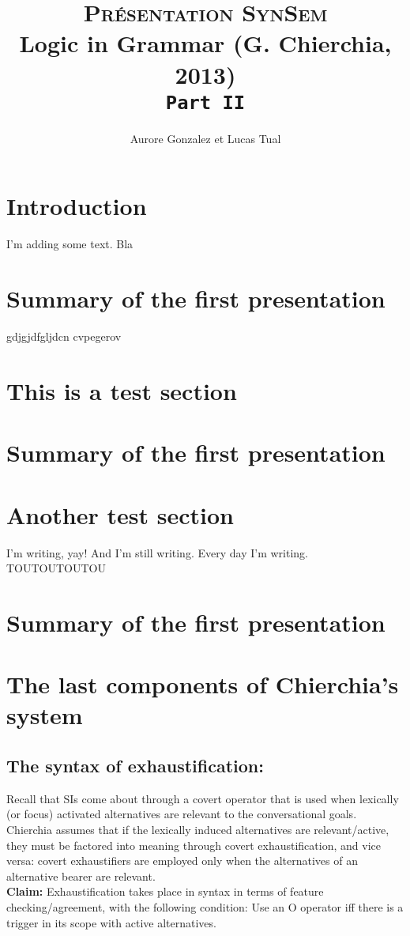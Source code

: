 \documentclass[a4paper,11pt]{article}
\title{\textsc{Présentation SynSem}\\Logic in Grammar (G. Chierchia, 2013)\\\vspace{0.3cm}\texttt{Part II}}
\author{Aurore Gonzalez et Lucas Tual}
\affil{LLING - University of Nantes}
\begin{document}
\maketitle
\tableofcontents


\section*{Introduction}
I'm adding some text. Bla

\section{Summary of the first presentation}

gdjgjdfgljdcn cvpegerov


\section{This is a test section}

\section{Summary of the first presentation}

\section{Another test section}
I'm writing, yay! And I'm still writing. Every day I'm writing. TOUTOUTOUTOU

\section{Summary of the first presentation}


\section{The last components of Chierchia's system}
\subsection{The syntax of exhaustification:}

Recall that SIs come about through a covert operator that is used when lexically (or focus) activated alternatives are relevant to the conversational goals. Chierchia assumes that if the lexically induced alternatives are relevant/active, they must be factored into meaning through covert exhaustification, and vice versa: covert exhaustifiers are employed only when the alternatives of an alternative bearer are relevant.
\\\textbf{Claim:} Exhaustification takes place in syntax in terms of feature checking/agreement, with the following condition: Use an O operator iff there is a trigger in its scope with active alternatives. 
\end{document}
